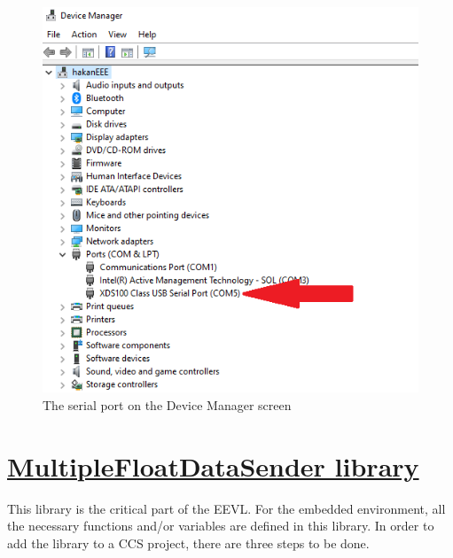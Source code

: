 \documentclass{article}
\begin{document}
\begin{figure}[H]
	\centering
	\includegraphics[scale=0.5]{Figures/DeviceManager.png}
	\caption{The serial port on the Device Manager screen}
	\label{fig:DeviceManager}
\end{figure}



\section{\href{https://github.com/hakansrc/fault_tolerant_drives/tree/master/Software/MultipleDataPlot/MultipleFloatDataSender}{MultipleFloatDataSender library}}
This library is the critical part of the EEVL. For the embedded environment, all the necessary functions and/or variables are defined in this library. In order to add the library to a CCS project, there are three steps to be done.
\end{document}
